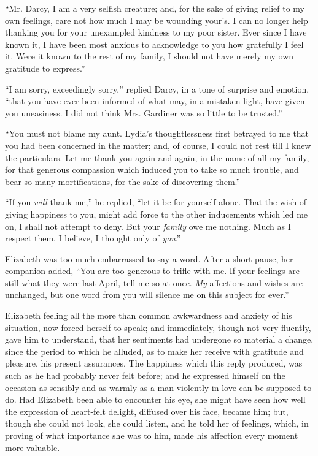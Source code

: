 “Mr. Darcy, I am a very selfish creature; and, for the
sake of giving relief to my own feelings, care not how
much I may be wounding your’s. I can no longer help
thanking you for your unexampled kindness to my poor
sister. Ever since I have known it, I have been most
anxious to acknowledge to you how gratefully I feel it.
Were it known to the rest of my family, I should not have
merely my own gratitude to express.”

“I am sorry, exceedingly sorry,” replied Darcy, in
a tone of surprise and emotion, “that you have ever
been informed of what may, in a mistaken light, have
given you uneasiness. I did not think Mrs. Gardiner was
so little to be trusted.”

“You must not blame my aunt. Lydia’s thoughtlessness
first betrayed to me that you had been concerned
in the matter; and, of course, I could not rest till I knew
the particulars. Let me thank you again and again, in
the name of all my family, for that generous compassion
which induced you to take so much trouble, and bear so
many mortifications, for the sake of discovering them.”

“If you \textit{will} thank me,” he replied, “let it be for yourself
alone. That the wish of giving happiness to you, might
add force to the other inducements which led me on, I shall
not attempt to deny. But your \textit{family} owe me nothing.
Much as I respect them, I believe, I thought only of \textit{you}.”

Elizabeth was too much embarrassed to say a word.
After a short pause, her companion added, “You are too
generous to trifle with me. If your feelings are still what
they were last April, tell me so at once. \textit{My} affections
and wishes are unchanged, but one word from you will
silence me on this subject for ever.”

Elizabeth feeling all the more than common awkwardness
and anxiety of his situation, now forced herself to
speak; and immediately, though not very fluently, gave
him to understand, that her sentiments had undergone so
material a change, since the period to which he alluded,
as to make her receive with gratitude and pleasure, his
present assurances. The happiness which this reply
produced, was such as he had probably never felt before;
and he expressed himself on the occasion as sensibly and
as warmly as a man violently in love can be supposed to
do. Had Elizabeth been able to encounter his eye, she
might have seen how well the expression of heart-felt
delight, diffused over his face, became him; but, though
she could not look, she could listen, and he told her of
feelings, which, in proving of what importance she was
to him, made his affection every moment more valuable.

